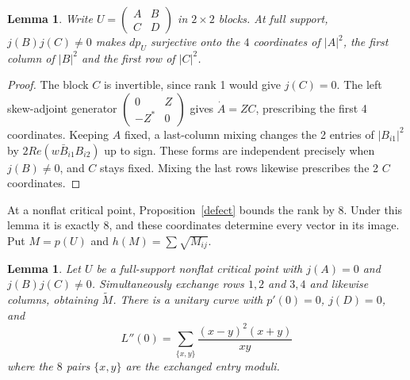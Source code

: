 \documentclass[11pt,a4paper]{article}
\newtheorem{lem}[thm]{Lemma}
\begin{document}
\begin{lem}\label{eightblocks}
Write $U=\left(\begin{smallmatrix}A&B\\C&D\end{smallmatrix}\right)$
in $2\times2$ blocks. At full support, $j(B)j(C)\ne0$ makes $dp_U$
surjective onto the $4$ coordinates of $|A|^2$, the first column of
$|B|^2$ and the first row of $|C|^2$.
\end{lem}
\begin{proof}
The block $C$ is invertible, since rank 1 would give $j(C)=0$.
The left skew-adjoint generator
$\left(\begin{smallmatrix}0&Z\\-Z^*&0\end{smallmatrix}\right)$
gives $\dot A=ZC$, prescribing the first 4 coordinates.
Keeping $A$ fixed, a last-column mixing changes the 2 entries of
$|B_{i1}|^2$ by $2Re(w\bar B_{i1}B_{i2})$ up to sign. These forms
are independent precisely when $j(B)\ne0$, and $C$ stays fixed.
Mixing the last rows likewise prescribes the 2 $C$ coordinates.
\end{proof}
At a nonflat critical point, Proposition~\ref{defect} bounds the rank
by 8. Under this lemma it is exactly 8, and these coordinates
determine every vector in its image. Put $M=p(U)$ and $h(M)=\sum\sqrt{M_{ij}}$.
\begin{lem}\label{blockcurve}
Let $U$ be a full-support nonflat critical point with $j(A)=0$ and
$j(B)j(C)\ne0$. Simultaneously exchange rows $1,2$ and
$3,4$ and likewise columns, obtaining $\tilde M$.
There is a unitary curve with $p'(0)=0$, $j(D)=0$, and
\[
 L''(0)=\sum_{\{x,y\}}\frac{(x-y)^2(x+y)}{xy}
\]
where the $8$ pairs $\{x,y\}$ are the exchanged entry moduli.
\end{lem}
\end{document}
